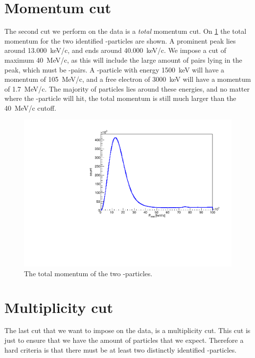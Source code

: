 \section{Momentum cut}
The second cut we perform on the data is a \textit{total} momentum cut. On \cref{fig:totalMomentum} the total momentum for the two identified \al-particles are shown. 
A prominent peak lies around \SI{13.000}{keV/c}, and ends around \SI{40.000 }{keV/c}. 
We impose a cut of maximum \SI{40}{MeV/c}, as this will include the large amount of pairs lying in the peak, which must be \al-\al pairs. A \al-particle with energy \SI{1500}{keV} will have a momentum of \SI{105}{MeV/c}, and a free electron of \SI{3000}{keV} will have a momentum of \SI{1.7}{MeV/c}. 
The majority of particles lies around these energies, and no matter where the \be-particle will hit, the total momentum is still much larger than the \SI{40}{MeV/c} cutoff. 
\begin{figure}[h]
	\centering
	\includegraphics[width=\linewidth]{../figures/ptotNoCut.pdf}
	\caption{The total momentum of the two \al-particles.}
	\label{fig:totalMomentum}
\end{figure}

\section{Multiplicity cut}
The last cut that we want to impose on the data, is a multiplicity cut. This cut is just to ensure that we have the amount of particles that we expect. 
Therefore a hard criteria is that there must be at least two distinctly identified \al-particles. \\

